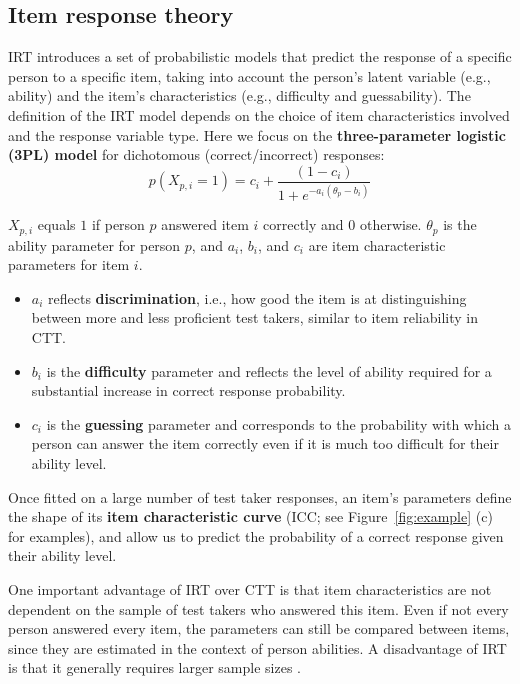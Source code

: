 \documentclass[11pt]{article}
\begin{document}
\subsection{Item response theory}

IRT introduces a set of probabilistic models that predict the response of a specific person to a specific item, taking into account the person's latent variable (e.g., ability) and the item's characteristics (e.g., difficulty and guessability). The definition of the IRT model depends on the choice of item characteristics involved and the response variable type. Here we focus on the \textbf{three-parameter logistic (3PL) model} for dichotomous (correct/incorrect) responses:
\begin{equation}
  p(X_{p,i} = 1) = c_i + \frac{(1 - c_i)}{1 + e^{-a_i (\theta_p - b_i)}}
  \label{eq:3plm}
\end{equation}

$X_{p,i}$ equals $1$ if person $p$ answered item $i$ correctly and $0$ otherwise. $\theta_p$ is the ability parameter for person $p$, and $a_i$, $b_i$, and $c_i$ are item characteristic parameters for item $i$.

\begin{itemize}
  \item $a_i$ reflects \textbf{discrimination}, i.e., how good the item is at distinguishing between more and less proficient test takers, similar to item reliability in CTT.
  \item $b_i$ is the \textbf{difficulty} parameter and reflects the level of ability required for a substantial increase in correct response probability.
  \item $c_i$ is the \textbf{guessing} parameter and corresponds to the probability with which a person can answer the item correctly even if it is much too difficult for their ability level.
\end{itemize}

Once fitted on a large number of test taker responses, an item's parameters define the shape of its \textbf{item characteristic curve} (ICC; see Figure~\ref{fig:example} (c) for examples), and allow us to predict the probability of a correct response given their ability level.

One important advantage of IRT over CTT is that item characteristics are not dependent on the sample of test takers who answered this item. Even if not every person answered every item, the parameters can still be compared between items, since they are estimated in the context of person abilities. A disadvantage of IRT is that it generally requires larger sample sizes \citep{Hambleton1993,Fan1998}.
\end{document}
